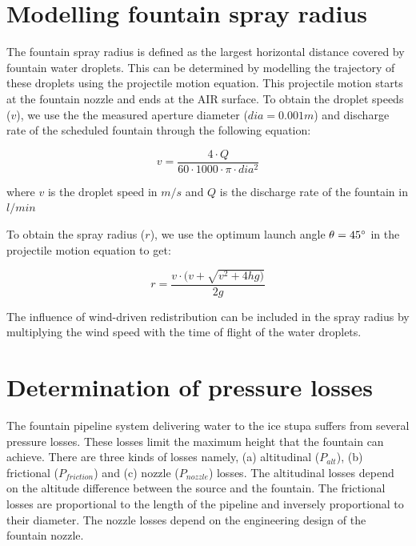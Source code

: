 \documentclass[tc, manuscript]{copernicus}
\begin{document}
\section{Modelling fountain spray radius} \label{sec:r_F}

The fountain spray radius is defined as the largest horizontal distance covered by fountain water droplets. This
can be determined by modelling the trajectory of these droplets using the projectile motion equation. This
projectile motion starts at the fountain nozzle and ends at the AIR surface.  To obtain the droplet speeds
($v$), we use the the measured aperture diameter ($dia = 0.001 m$) and discharge rate of the scheduled fountain
through the following equation:

\begin{equation}
	\label{eqn:dis}
v = \frac{4 \cdot Q}{60 \cdot 1000 \cdot \pi \cdot dia^2}
\end{equation}

where $v$ is the droplet speed in $m/s$ and $Q$ is the discharge rate of the fountain in $l/min$

To obtain the spray radius ($r$), we use the optimum launch angle $\theta = 45 ^{\circ}$ in the projectile motion
equation to get:

\begin{equation}
  \label{eqn:radf}
  r = \frac{v \cdot(v + \sqrt{v^2 + 4hg)}}{2g}
\end{equation}

The influence of wind-driven redistribution can be included in the spray radius by multiplying the wind speed
with the time of flight of the water droplets.

\section{Determination of pressure losses} \label{sec:p_loss}

The fountain pipeline system delivering water to the ice stupa suffers from several pressure losses. These
losses limit the maximum height that the fountain can achieve. There are three kinds of losses namely, (a)
altitudinal ($P_{alt}$), (b) frictional ($P_{friction}$) and (c) nozzle ($P_{nozzle}$) losses. The altitudinal
losses depend on the altitude difference between the source and the fountain. The frictional losses are
proportional to the length of the pipeline and inversely proportional to their diameter. The nozzle losses
depend on the engineering design of the fountain nozzle.
\end{document}
